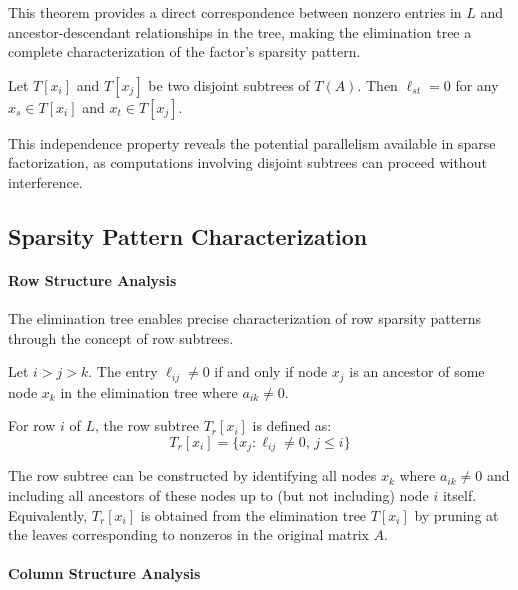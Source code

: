 This theorem provides a direct correspondence between nonzero entries in \(L\) and ancestor-descendant relationships in the tree, making the elimination tree a complete characterization of the factor's sparsity pattern.

\begin{theorem}
Let \(T[x_i]\) and \(T[x_j]\) be two disjoint subtrees of \(T(A)\). Then \(\ell_{st} = 0\) for any \(x_s \in T[x_i]\) and \(x_t \in T[x_j]\).
\end{theorem}

This independence property reveals the potential parallelism available in sparse factorization, as computations involving disjoint subtrees can proceed without interference.

\subsection{Sparsity Pattern Characterization}

\paragraph{Row Structure Analysis}

The elimination tree enables precise characterization of row sparsity patterns through the concept of row subtrees.

\begin{theorem}
Let \(i > j > k\). The entry \(\ell_{ij} \neq 0\) if and only if node \(x_j\) is an ancestor of some node \(x_k\) in the elimination tree where \(a_{ik} \neq 0\).
\end{theorem}

\begin{definition}
For row \(i\) of \(L\), the row subtree \(T_r[x_i]\) is defined as:
\[
T_r[x_i] = \{x_j : \ell_{ij} \neq 0,\, j \leq i\}
\]
\end{definition}

The row subtree can be constructed by identifying all nodes \(x_k\) where \(a_{ik} \neq 0\) and including all ancestors of these nodes up to (but not including) node \(i\) itself. Equivalently, \(T_r[x_i]\) is obtained from the elimination tree \(T[x_i]\) by pruning at the leaves corresponding to nonzeros in the original matrix \(A\).

\paragraph{Column Structure Analysis}

